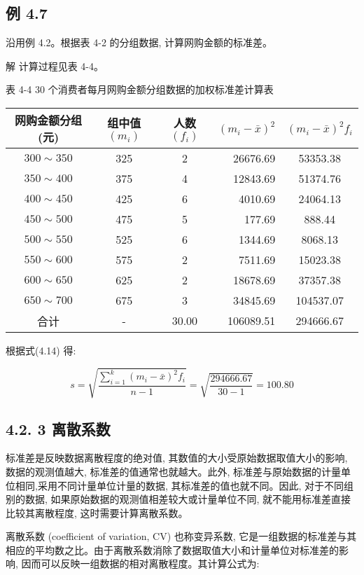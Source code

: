 \documentclass[10pt]{article}
\begin{document}
\begin{CJK*}{UTF8}{bsmi}
\section*{例 4.7}
沿用例 4.2。根据表 4-2 的分组数据, 计算网购金额的标准差。

解 计算过程见表 4-4。

表 4-4 30 个消费者每月网购金额分组数据的加权标准差计算表

\begin{center}
\begin{tabular}{cccrc}
\hline
网购金额分组 (元) & 组中值 $\left(m_{i}\right)$ & 人数 $\left(f_{i}\right)$ & $\left(m_{i}-\bar{x}\right)^{2}$ & $\left(m_{i}-\bar{x}\right)^{2} f_{i}$ \\
\hline
$300 \sim 350$ & 325 & 2 & 26676.69 & 53353.38 \\
$350 \sim 400$ & 375 & 4 & 12843.69 & 51374.76 \\
$400 \sim 450$ & 425 & 6 & 4010.69 & 24064.13 \\
$450 \sim 500$ & 475 & 5 & 177.69 & 888.44 \\
$500 \sim 550$ & 525 & 6 & 1344.69 & 8068.13 \\
$550 \sim 600$ & 575 & 2 & 7511.69 & 15023.38 \\
$600 \sim 650$ & 625 & 2 & 18678.69 & 37357.38 \\
$650 \sim 700$ & 675 & 3 & 34845.69 & 104537.07 \\
\hline
合计 & - & 30.00 & 106089.51 & 294666.67 \\
\hline
\end{tabular}
\end{center}

根据式(4.14) 得:

$$
s=\sqrt{\frac{\sum_{i=1}^{k}\left(m_{i}-\bar{x}\right)^{2} f_{i}}{n-1}}=\sqrt{\frac{294666.67}{30-1}}=100.80
$$

\subsection*{4.2. 3 离散系数}
标准差是反映数据离散程度的绝对值, 其数值的大小受原始数据取值大小的影响, 数据的观测值越大, 标准差的值通常也就越大。此外, 标准差与原始数据的计量单位相同,采用不同计量单位计量的数据, 其标准差的值也就不同。因此, 对于不同组别的数据, 如果原始数据的观测值相差较大或计量单位不同, 就不能用标准差直接比较其离散程度, 这时需要计算离散系数。

离散系数 (coefficient of variation, CV) 也称变异系数, 它是一组数据的标准差与其相应的平均数之比。由于离散系数消除了数据取值大小和计量单位对标准差的影响, 因而可以反映一组数据的相对离散程度。其计算公式为:



\end{CJK*}
\end{document}
